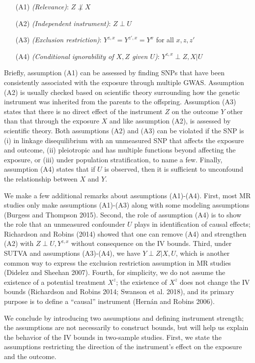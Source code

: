 \documentclass[
]{article}
\providecommand{\tightlist}{%
  \setlength{\itemsep}{0pt}\setlength{\parskip}{0pt}}
\theoremstyle{plain}
\begin{document}
\begin{itemize}
\tightlist
\item[(A1)] \emph{(Relevance)}: $Z \not\perp X$ 
\item[(A2)] \emph{(Independent instrument)}: $Z \perp U$
\item[(A3)] \emph{(Exclusion restriction)}: $Y^{z,x} = Y^{z',x} = Y^{x}$ for all $x,z,z'$
\item[(A4)] \emph{(Conditional ignorability of $X,Z$ given $U$)}: $Y^{z,x} \perp Z, X | U$
\end{itemize}

Briefly, assumption (A1) can be assessed by finding SNPs that have been consistently associated with the exposure through multiple GWAS. Assumption (A2) is usually checked based on scientific theory surrounding how the genetic instrument was inherited from the parents to the offspring. Assumption (A3) states that there is no direct effect of the instrument \(Z\) on the outcome \(Y\) other than that through the exposure \(X\) and like assumption (A2), is assessed by scientific theory. Both assumptions (A2) and (A3) can be violated if the SNP is (i) in linkage disequilibrium with an unmeasured SNP that affects the exposure and outcome, (ii) pleiotropic and has multiple functions beyond affecting the exposure, or (iii) under population stratification, to name a few. Finally, assumption (A4) states that if \(U\) is observed, then it is sufficient to unconfound the relationship between \(X\) and \(Y\).

We make a few additional remarks about assumptions (A1)-(A4). First, most MR studies only make assumptions (A1)-(A3) along with some modeling assumptions (Burgess and Thompson 2015). Second, the role of assumption (A4) is to show the role that an unmeasured confounder \(U\) plays in identification of causal effects; Richardson and Robins (2014) showed that one can remove (A4) and strengthen (A2) with \(Z \perp U, Y^{z,x}\) without consequence on the IV bounds. Third, under SUTVA and assumptions (A3)-(A4), we have \(Y \perp Z | X, U\), which is another common way to express the exclusion restriction assumption in MR studies (Didelez and Sheehan 2007). Fourth, for simplicity, we do not assume the existence of a potential treatment \(X^{z}\); the existence of \(X^z\) does not change the IV bounds (Richardson and Robins 2014; Swanson et al. 2018), and its primary purpose is to define a ``causal'' instrument (Hernán and Robins 2006).

We conclude by introducing two assumptions and defining instrument strength; the assumptions are not necessarily to construct bounds, but will help us explain the behavior of the IV bounds in two-sample studies. First, we state the assumptions restricting the direction of the instrument's effect on the exposure and the outcome.
\end{document}
